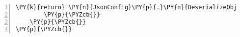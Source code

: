 \begin{Verbatim}[commandchars=\\\{\},numbers=left,firstnumber=1,stepnumber=1,numberblanklines=0]
            \PY{k}{return} \PY{n}{JsonConfig}\PY{p}{.}\PY{n}{DeserializeObject}\PY{p}{\PYZlt{}}\PY{n}{T}\PY{p}{\PYZgt{}}\PY{p}{(}\PY{n}{contentBody}\PY{p}{)}\PY{p}{;}
        \PY{p}{\PYZcb{}}
    \PY{p}{\PYZcb{}}
\PY{p}{\PYZcb{}}
\end{Verbatim}
